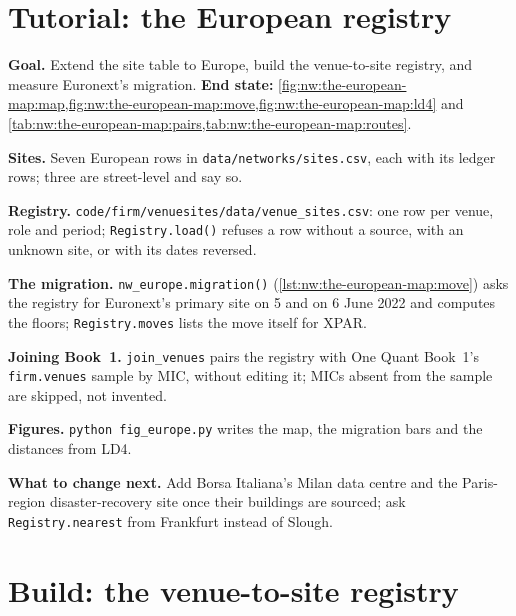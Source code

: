 \label{lst:nw:the-european-map:dates}

\section{Tutorial: the European registry}\label{tut:nw:the-european-map:tut}

\begin{tutorial}
\textbf{Goal.} Extend the site table to Europe, build the venue-to-site registry, and measure Euronext's migration.
\textbf{End state:} \cref{fig:nw:the-european-map:map,fig:nw:the-european-map:move,fig:nw:the-european-map:ld4} and
\cref{tab:nw:the-european-map:pairs,tab:nw:the-european-map:routes}.
\begin{tutsteps}
\item \textbf{Sites.} Seven European rows in \texttt{data/networks/sites.csv}, each with its ledger rows; three are street-level and say so.
\item \textbf{Registry.} \texttt{code/firm/venuesites/data/venue\_sites.csv}: one row per venue, role and period;
  \texttt{Registry.load()} refuses a row without a source, with an unknown site, or with its dates reversed.
\item \textbf{The migration.} \texttt{nw\_europe.migration()} (\cref{lst:nw:the-european-map:move}) asks the registry for Euronext's primary
  site on 5 and on 6 June 2022 and computes the floors; \texttt{Registry.moves} lists the move itself for XPAR.
\item \textbf{Joining Book~1.} \texttt{join\_venues} pairs the registry with One Quant Book~1's \texttt{firm.venues} sample by MIC, without
  editing it; MICs absent from the sample are skipped, not invented.
\item \textbf{Figures.} \texttt{python fig\_europe.py} writes the map, the migration bars and the distances from LD4.
\end{tutsteps}
\textbf{What to change next.} Add Borsa Italiana's Milan data centre and the Paris-region disaster-recovery site once their buildings are
sourced; ask \texttt{Registry.nearest} from Frankfurt instead of Slough.
\end{tutorial}

\section{Build: the venue-to-site registry}\label{bld:nw:the-european-map:venuesites}

